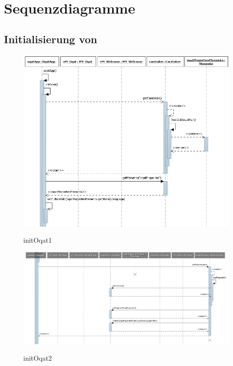 \chapter {Sequenzdiagramme}
\section{Initialisierung von \projektTitel}
\begin{figure}[h]
\includegraphics[width=\linewidth]{bilder/Sequenzdiagramm/initOqat1.png}
\label{}
\caption{initOqat1}
\end{figure}

\begin{figure}[h]
\includegraphics[width=\linewidth]{bilder/Sequenzdiagramm/initOqat2.png}
\label{}
\caption{initOqat2}
\end{figure}

